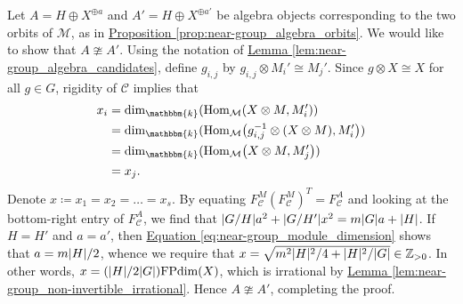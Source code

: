 \documentclass[12pt, reqno]{amsart}
\numberwithin{equation}{section}
\theoremstyle{plainspace}
\theoremstyle{definitionspace}
\theoremstyle{remarkspace}
\renewenvironment{proof}{{\noindent\textbf{Proof.}}}{\null\hfill\qedsymbol}
\DeclarePairedDelimiter{\abs}{\lvert}{\rvert}
\newcommand{\mathcat}[1]{\mathcal{#1}}
\newcommand{\Hom}[2][]{
	\ifthenelse{\equal{#2}{}}
		{\textup{Hom}_{#1}}
		{\textup{Hom}_{#1}\!\left(#2\right)}
}
\newcommand{\FPdim}{\textup{FPdim}}
\begin{document}
\begin{proof}
\noindent Let $A = H \oplus X^{\oplus a}$ and $A' = H \oplus X^{\oplus a'}$ be algebra objects corresponding to the two orbits of $\mathcat{M}$, as in \hyperref[prop:near-group_algebra_orbits]{Proposition \ref*{prop:near-group_algebra_orbits}}. We would like to show that $A \ncong A'$. Using the notation of \hyperref[lem:near-group_algebra_candidates]{Lemma \ref*{lem:near-group_algebra_candidates}}, define $g_{i,j}$ by $g_{i,j} \otimes M_i' \cong M_j'$. Since $g \otimes X \cong X$ for all $g \in G$, rigidity of $\mathcat{C}$ implies that
\begin{align*}
\begin{split}
x_i &= \dim_{\mathbbm{k}}(\Hom[\mathcat{M}]{X \otimes M, M_i'}) \\
&= \dim_{\mathbbm{k}}(\Hom[\mathcat{M}]{g_{i,j}^{-1} \otimes (X \otimes M), M_i'}) \\
&= \dim_{\mathbbm{k}}(\Hom[\mathcat{M}]{X \otimes M, M_j'}) \\
&= x_j.
\end{split}
\end{align*}
\noindent Denote $x \coloneqq x_1 = x_2 = \dots = x_s$. By equating $F_{\mathcat{C}}^M(F_{\mathcat{C}}^M)^T = F_{\mathcat{C}}^A$ and looking at the bottom-right entry of $F_{\mathcat{C}}^A$, we find that $\abs{G/H}a^2 + \abs{G/H'}x^2 = m\abs{G}a + \abs{H}$. If $H = H'$ and $a = a'$, then \hyperref[eq:near-group_module_dimension]{Equation \ref*{eq:near-group_module_dimension}} shows that $a = m\abs{H}/2$, whence we require that $x = \sqrt{m^2\abs{H}^2/4 + \abs{H}^2/\abs{G}} \in \mathbb{Z}_{>0}$. In other words, $x = (\abs{H}/2\abs{G})\FPdim(X)$, which is irrational by \hyperref[lem:near-group_non-invertible_irrational]{Lemma \ref*{lem:near-group_non-invertible_irrational}}. Hence $A \ncong A'$, completing the proof.
\end{proof}
\newline
\end{document}
